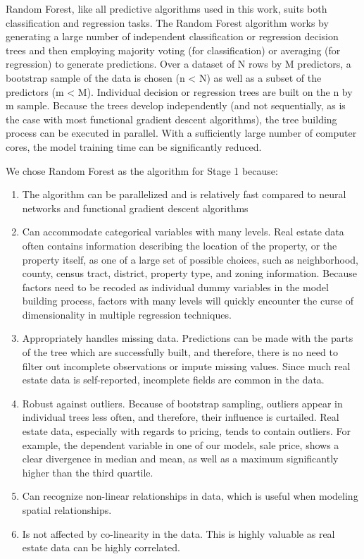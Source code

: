 \documentclass[12pt,]{article}
\providecommand{\tightlist}{%
  \setlength{\itemsep}{0pt}\setlength{\parskip}{0pt}}
\begin{document}
Random Forest, like all predictive algorithms used in this work, suits
both classification and regression tasks. The Random Forest algorithm
works by generating a large number of independent classification or
regression decision trees and then employing majority voting (for
classification) or averaging (for regression) to generate predictions.
Over a dataset of N rows by M predictors, a bootstrap sample of the data
is chosen (n \textless{} N) as well as a subset of the predictors (m
\textless{} M). Individual decision or regression trees are built on the
n by m sample. Because the trees develop independently (and not
sequentially, as is the case with most functional gradient descent
algorithms), the tree building process can be executed in parallel. With
a sufficiently large number of computer cores, the model training time
can be significantly reduced.

We chose Random Forest as the algorithm for Stage 1 because:

\begin{enumerate}
\def\labelenumi{\arabic{enumi})}
\tightlist
\item
  The algorithm can be parallelized and is relatively fast compared to
  neural networks and functional gradient descent algorithms
\item
  Can accommodate categorical variables with many levels. Real estate
  data often contains information describing the location of the
  property, or the property itself, as one of a large set of possible
  choices, such as neighborhood, county, census tract, district,
  property type, and zoning information. Because factors need to be
  recoded as individual dummy variables in the model building process,
  factors with many levels will quickly encounter the curse of
  dimensionality in multiple regression techniques.
\item
  Appropriately handles missing data. Predictions can be made with the
  parts of the tree which are successfully built, and therefore, there
  is no need to filter out incomplete observations or impute missing
  values. Since much real estate data is self-reported, incomplete
  fields are common in the data.
\item
  Robust against outliers. Because of bootstrap sampling, outliers
  appear in individual trees less often, and therefore, their influence
  is curtailed. Real estate data, especially with regards to pricing,
  tends to contain outliers. For example, the dependent variable in one
  of our models, sale price, shows a clear divergence in median and
  mean, as well as a maximum significantly higher than the third
  quartile.
\item
  Can recognize non-linear relationships in data, which is useful when
  modeling spatial relationships.
\item
  Is not affected by co-linearity in the data. This is highly valuable
  as real estate data can be highly correlated.
\end{enumerate}
\end{document}
